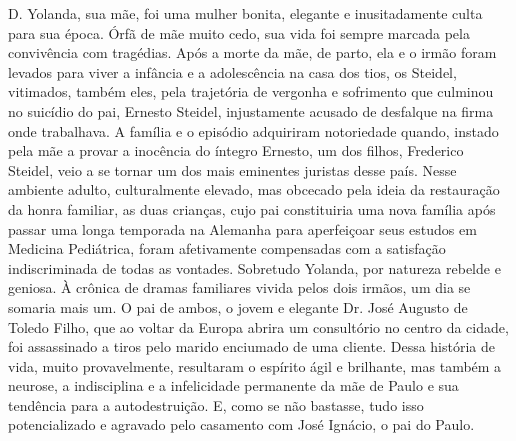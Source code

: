 D. Yolanda, sua mãe, foi uma mulher bonita, elegante e inusitadamente culta para sua época.
Órfã de mãe muito cedo, sua vida foi sempre marcada pela convivência com tragédias.
Após a morte da mãe, de parto, ela e o irmão foram levados para viver a infância e a adolescência na casa dos tios, os Steidel, vitimados, também eles, pela trajetória de vergonha e sofrimento que culminou no suicídio do pai, Ernesto Steidel, injustamente acusado de desfalque na firma onde trabalhava.
A família e o episódio adquiriram notoriedade quando, instado pela mãe a provar a inocência do íntegro Ernesto, um dos filhos, Frederico Steidel, veio a se tornar um dos mais eminentes juristas desse país.
Nesse ambiente adulto, culturalmente elevado, mas obcecado pela ideia da restauração da honra familiar, as duas crianças, cujo pai constituiria uma nova família após passar uma longa temporada na Alemanha para aperfeiçoar seus estudos em Medicina Pediátrica, foram afetivamente compensadas com a satisfação indiscriminada de todas as vontades.
Sobretudo Yolanda, por natureza rebelde e geniosa.
À crônica de dramas familiares vivida pelos dois irmãos, um dia se somaria mais um.
O pai de ambos, o jovem e elegante Dr. José Augusto de Toledo Filho, que ao voltar da Europa abrira um consultório no centro da cidade, foi assassinado a tiros pelo marido enciumado de uma cliente.
Dessa história de vida, muito provavelmente, resultaram o espírito ágil e brilhante, mas também a neurose, a indisciplina e a infelicidade permanente da mãe de Paulo e sua tendência para a autodestruição.
E, como se não bastasse, tudo isso potencializado e agravado pelo casamento com José Ignácio, o pai do Paulo.

